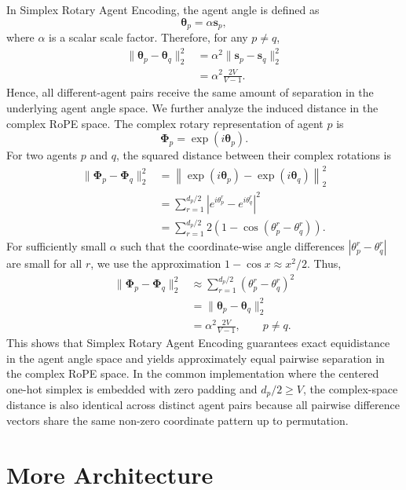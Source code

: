 In Simplex Rotary Agent Encoding, the agent angle is defined as
\begin{equation}
\boldsymbol{\theta}_p
=
\alpha\mathbf{s}_p,
\end{equation}
where $\alpha$ is a scalar scale factor. 
Therefore, for any $p\neq q$,
\begin{align}
\|\boldsymbol{\theta}_p-\boldsymbol{\theta}_q\|_2^2
&=
\alpha^2
\|\mathbf{s}_p-\mathbf{s}_q\|_2^2 \\
&=
\alpha^2
\frac{2V}{V-1}.
\end{align}
Hence, all different-agent pairs receive the same amount of separation in the underlying agent angle space. We further analyze the induced distance in the complex RoPE space. 
The complex rotary representation of agent $p$ is
\begin{equation}
\boldsymbol{\Phi}_p
=
\exp(i\boldsymbol{\theta}_p).
\end{equation}
For two agents $p$ and $q$, the squared distance between their complex rotations is
\begin{align}
\|\boldsymbol{\Phi}_p-\boldsymbol{\Phi}_q\|_2^2
&=
\left\|
\exp(i\boldsymbol{\theta}_p)
-
\exp(i\boldsymbol{\theta}_q)
\right\|_2^2 \\
&=
\sum_{r=1}^{d_p/2}
\left|
e^{i\theta_p^r}
-
e^{i\theta_q^r}
\right|^2 \\
&=
\sum_{r=1}^{d_p/2}
2\left(
1-\cos(\theta_p^r-\theta_q^r)
\right).
\end{align}
For sufficiently small $\alpha$ such that the coordinate-wise angle differences $|\theta_p^r-\theta_q^r|$ are small for all $r$, we use the approximation $1-\cos x\approx x^2/2$. 
Thus,
\begin{align}
\|\boldsymbol{\Phi}_p-\boldsymbol{\Phi}_q\|_2^2
&\approx
\sum_{r=1}^{d_p/2}
(\theta_p^r-\theta_q^r)^2 \\
&=
\|\boldsymbol{\theta}_p-\boldsymbol{\theta}_q\|_2^2 \\
&=
\alpha^2
\frac{2V}{V-1},
\qquad p\neq q.
\end{align}
This shows that Simplex Rotary Agent Encoding guarantees exact equidistance in the agent angle space and yields approximately equal pairwise separation in the complex RoPE space. 
In the common implementation where the centered one-hot simplex is embedded with zero padding and $d_p/2\geq V$, the complex-space distance is also identical across distinct agent pairs because all pairwise difference vectors share the same non-zero coordinate pattern up to permutation.

\section{More Architecture}
\label{app:more-architecture}

